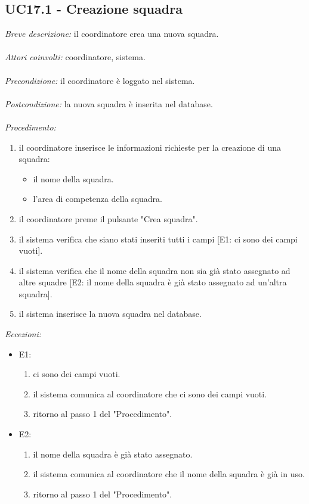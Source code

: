 \subsection{UC17.1 - Creazione squadra}
\textit{Breve descrizione:} il coordinatore crea una nuova squadra. 
\\
\\
\textit{Attori coinvolti:} coordinatore, sistema.
\\
\\
\textit{Precondizione:} il coordinatore è loggato nel sistema.
\\
\\
\textit{Postcondizione:} la nuova squadra è inserita nel database.
\\
\\
\textit{Procedimento:}
\begin{enumerate}
	\item il coordinatore inserisce le informazioni richieste per la creazione di una squadra:
	\begin{itemize}
		\item il nome della squadra.
		\item l'area di competenza della squadra.
	\end{itemize}
	\item il coordinatore preme il pulsante "Crea squadra".
	\item il sistema verifica che siano stati inseriti tutti i campi [E1: ci sono dei campi vuoti].
	\item il sistema verifica che il nome della squadra non sia già stato assegnato ad altre squadre [E2: il nome della squadra è già stato assegnato ad un'altra squadra].
	\item il sistema inserisce la nuova squadra nel database. 
\end{enumerate}

\textit{Eccezioni:}
\begin{itemize}
	\item E1:
	\begin{enumerate}
		\item ci sono dei campi vuoti.
		\item il sistema comunica al coordinatore che ci sono dei campi vuoti.
		\item ritorno al passo 1 del "Procedimento".
	\end{enumerate}
	\item E2:
	\begin{enumerate}
		\item il nome della squadra è già stato assegnato.
		\item il sistema comunica al coordinatore che il nome della squadra è già in uso.
		\item ritorno al passo 1 del "Procedimento".
	\end{enumerate}
\end{itemize}


